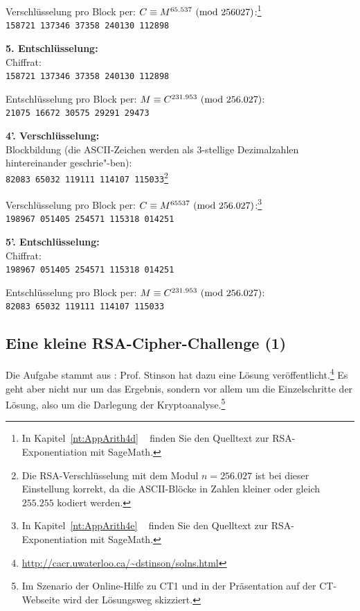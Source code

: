 \begin{refsegment}
\label{SrcArith4d}
 Verschlüsselung pro Block per: $C \equiv M^{65.537}{\rm ~(mod~}256027)$:\footnote{%
  In Kapitel~\ref{nt:AppArith4d} \glqq {}\grqq~
  finden Sie den Quelltext zur RSA-Exponentiation mit SageMath.
}\\
{\tt 158721 137346 37358 240130 112898}

 \textbf{5. Entschlüsselung:}\\
Chiffrat:\\
{\tt 158721 137346 37358 240130 112898}

 Entschlüsselung pro Block per: $M \equiv C^{231.953}{\rm ~(mod~}256.027)$:\\
{\tt 21075 16672 30575 29291 29473}


 \textbf{4'. Verschlüsselung:}\\
Blockbildung (die ASCII-Zeichen werden als 3-stellige Dezimalzahlen hintereinander geschrie"-ben):\\
{\tt 82083 65032 119111 114107 115033}\footnote{%
Die RSA-Verschlüsselung mit dem Modul $n=256.027$ ist bei dieser Einstellung korrekt,
da die ASCII-Blöcke in Zahlen kleiner oder gleich $255.255$ kodiert werden.
}

\label{SrcArith4e}
 Verschlüsselung pro Block per: $C \equiv M^{65537}{\rm ~(mod~}256.027)$:\footnote{%
  In Kapitel~\ref{nt:AppArith4e} \glqq {}\grqq~
  finden Sie den Quelltext zur RSA-Exponentiation mit SageMath.
}\\
{\tt 198967 051405 254571 115318 014251}

 \textbf{5'. Entschlüsselung:}\\
Chiffrat:\\
{\tt 198967 051405 254571 115318 014251}

 Entschlüsselung pro Block per: $M \equiv C^{231.953}{\rm ~(mod~}256.027)$:\\
{\tt 82083 65032 119111 114107 115033}



\subsection{Eine kleine RSA-Cipher-Challenge (1)}
Die Aufgabe stammt aus \cite[Exercise 4.6]{Stin2006}:
Prof. Stinson hat dazu eine Lösung veröffentlicht.\footnote{%
\url{http://cacr.uwaterloo.ca/~dstinson/solns.html}
}
Es geht aber nicht nur um das Ergebnis, sondern vor allem
um die Einzelschritte der Lösung, also um die Darlegung der
Kryptoanalyse.\footnote{%
Im Szenario der Online-Hilfe zu CT1 und in der
Präsentation auf der CT-Webseite wird der Lösungsweg skizziert.
}


\end{refsegment}
